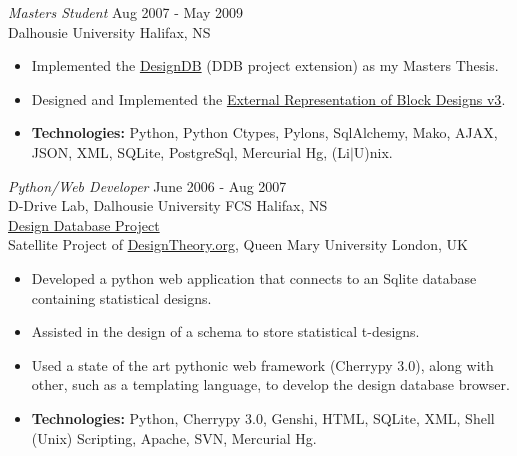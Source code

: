 \documentclass[line,margin]{res}
\begin{document}
\begin{resume}
   {\sl Masters Student} \hfill Aug 2007 - May 2009 \\
     Dalhousie University \hfill Halifax, NS \smallskip
      \begin{itemize}  \itemsep -2pt %
       \item Implemented the
       \href{http://batman.cs.dal.ca/~peter/designdb/}{DesignDB} (DDB
       project extension) as my Masters Thesis.
       \item Designed and Implemented the
       \href{http://designtheory.org/library/extrep/}{External
       Representation of Block Designs v3}.
       \item {\bf Technologies:} \hspace{1pt}
        Python, Python Ctypes, Pylons, SqlAlchemy, Mako, AJAX, \newline
        \hspace*{72pt} JSON, XML, SQLite, PostgreSql, Mercurial Hg,
        (Li$|$U)nix.
    \end{itemize}

    {\sl Python/Web Developer} \hfill June 2006 - Aug 2007 \\
    D-Drive Lab, Dalhousie University FCS \hfill Halifax, NS \\
    \href{http://batman.cs.dal.ca/~peter/designdb/}{Design Database Project}\\
    Satellite Project of \href{http://designtheory.org}{DesignTheory.org},
    Queen Mary University \hfill London, UK \smallskip
        \begin{itemize}  \itemsep -2pt %
    \item Developed a python web application that connects to an Sqlite
    database \\ containing statistical designs.
    \item Assisted in the design of a schema to store statistical t-designs.
    \item Used a state of the art pythonic web framework (Cherrypy 3.0),
    along with other, such as a templating language, to develop the design
    database browser.
    \item {\bf Technologies:} \hspace{1pt}
        Python, Cherrypy 3.0, Genshi, HTML, SQLite, XML, \newline
        \hspace*{72pt} Shell (Unix) Scripting, Apache, SVN, Mercurial Hg.
        \end{itemize}


\end{resume}
\end{document}
